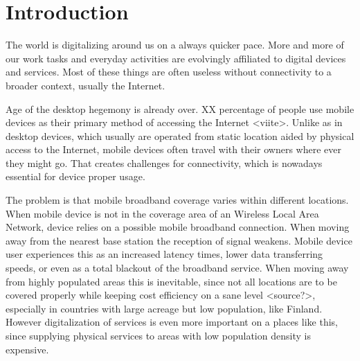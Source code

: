 \chapter{Introduction}



The world is digitalizing around us on a always quicker pace. More and more of our work tasks and everyday activities are evolvingly affiliated to digital devices and services. Most of these things are often useless without connectivity to a broader context, usually the Internet. 

Age of the desktop hegemony is already over. XX percentage of people use mobile devices as their primary method of accessing the Internet <viite>. Unlike as in desktop devices, which usually are operated from static location aided by physical access to the Internet, mobile devices often travel with their owners where ever they might go. That creates challenges for connectivity, which is nowadays essential for device proper usage. 

The problem is that mobile broadband coverage varies within different locations. When mobile device is not in the coverage area of an Wireless Local Area Network, device relies on a possible mobile broadband connection. When moving away from the nearest base station the reception of signal weakens. Mobile device user experiences this as an increased latency times, lower data transferring speeds, or even as a total blackout of the broadband service. When moving away from highly populated areas this is inevitable, since not all locations are to be covered properly while keeping cost efficiency on a sane level <source?>, especially in countries with large acreage but low population, like Finland. However digitalization of services is even more important on a places like this, since supplying physical services to areas with low population density is expensive. 


